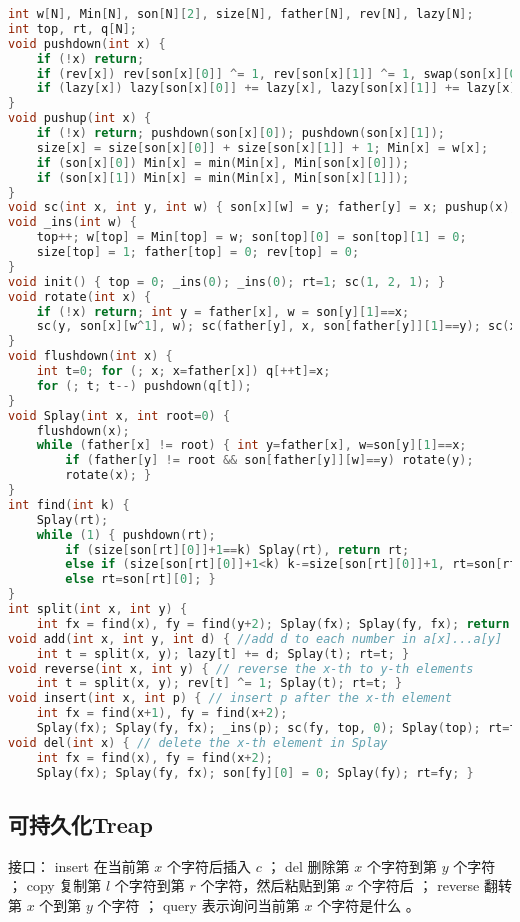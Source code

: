 \documentclass[landscape,a4paper]{article}
\begin{document}
\begin{lstlisting}[language=C++]
int w[N], Min[N], son[N][2], size[N], father[N], rev[N], lazy[N];
int top, rt, q[N];
void pushdown(int x) {
	if (!x) return;
	if (rev[x]) rev[son[x][0]] ^= 1, rev[son[x][1]] ^= 1, swap(son[x][0], son[x][1]), rev[x] = 0;
	if (lazy[x]) lazy[son[x][0]] += lazy[x], lazy[son[x][1]] += lazy[x], w[x] += lazy[x], Min[x] += lazy[x], lazy[x] = 0;
}
void pushup(int x) {
	if (!x) return; pushdown(son[x][0]); pushdown(son[x][1]);
	size[x] = size[son[x][0]] + size[son[x][1]] + 1; Min[x] = w[x];
	if (son[x][0]) Min[x] = min(Min[x], Min[son[x][0]]);
	if (son[x][1]) Min[x] = min(Min[x], Min[son[x][1]]);
}
void sc(int x, int y, int w) { son[x][w] = y; father[y] = x; pushup(x); }
void _ins(int w) {
	top++; w[top] = Min[top] = w; son[top][0] = son[top][1] = 0;
	size[top] = 1; father[top] = 0; rev[top] = 0;
}
void init() { top = 0; _ins(0); _ins(0); rt=1; sc(1, 2, 1); }
void rotate(int x) {
	if (!x) return; int y = father[x], w = son[y][1]==x;
	sc(y, son[x][w^1], w); sc(father[y], x, son[father[y]][1]==y); sc(x, y, w^1);
}
void flushdown(int x) {
	int t=0; for (; x; x=father[x]) q[++t]=x;
	for (; t; t--) pushdown(q[t]);
}
void Splay(int x, int root=0) {
	flushdown(x);
	while (father[x] != root) { int y=father[x], w=son[y][1]==x;
		if (father[y] != root && son[father[y]][w]==y) rotate(y);
		rotate(x); }
}
int find(int k) {
	Splay(rt);
	while (1) {	pushdown(rt);
		if (size[son[rt][0]]+1==k) Splay(rt), return rt;
		else if (size[son[rt][0]]+1<k) k-=size[son[rt][0]]+1, rt=son[rt][1];
		else rt=son[rt][0]; }
}
int split(int x, int y) {
	int fx = find(x), fy = find(y+2); Splay(fx); Splay(fy, fx); return son[fy][0]; }
void add(int x, int y, int d) { //add d to each number in a[x]...a[y]
	int t = split(x, y); lazy[t] += d; Splay(t); rt=t; }
void reverse(int x, int y) { // reverse the x-th to y-th elements
	int t = split(x, y); rev[t] ^= 1; Splay(t); rt=t; }
void insert(int x, int p) { // insert p after the x-th element
	int fx = find(x+1), fy = find(x+2);
	Splay(fx); Splay(fy, fx); _ins(p); sc(fy, top, 0); Splay(top); rt=top; }
void del(int x) { // delete the x-th element in Splay
	int fx = find(x), fy = find(x+2);
	Splay(fx); Splay(fy, fx); son[fy][0] = 0; Splay(fy); rt=fy; }
\end{lstlisting}

\subsection{可持久化Treap}
接口： 
 insert 在当前第 $x$ 个字符后插入 $c$ ；
 del 删除第 $x$ 个字符到第 $y$ 个字符 ；
 copy 复制第 $l$ 个字符到第 $r$ 个字符，然后粘贴到第 $x$ 个字符后 ；
 reverse 翻转第 $x$ 个到第 $y$ 个字符 ；
 query 表示询问当前第 $x$ 个字符是什么 。
\end{document}
